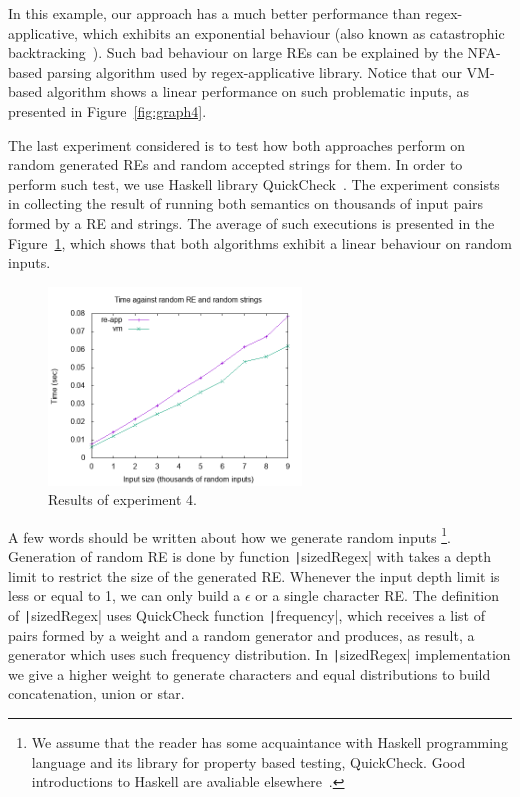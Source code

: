 \documentclass[review]{elsarticle}
\newcommand{\haskell}[1]{\texttt|#1|}
\theoremstyle{definition}
\begin{document}
In this example, our approach has a much better performance than
regex-applicative, which exhibits an exponential behaviour (also known as
catastrophic backtracking~\cite{Kirrage13}). Such bad 
behaviour on large REs can be explained by the NFA-based parsing algorithm  
used by regex-applicative library. Notice that our VM-based algorithm shows 
a linear performance on such problematic inputs, as presented in
Figure~\ref{fig:graph4}.

The last experiment considered is to test how both approaches perform
on random generated REs and random accepted strings for them. In order to
perform such test, we use Haskell library QuickCheck~\cite{Claessen2000}.
The experiment consists in collecting the result of running both semantics 
on thousands of input pairs formed by a RE and strings. The average of such 
executions is presented in the Figure~\ref{fig:graph5}, which shows that both 
algorithms exhibit a linear behaviour  on random inputs.

\begin{figure}[h]
    \includegraphics[width=0.6\textwidth]{random.png}
   \centering
   \caption{Results of experiment 4.}
   \label{fig:graph5}
\end{figure}

A few words should be written about how we generate random inputs
\footnote{We
  assume that the reader has some acquaintance with Haskell programming language
and its library for property based testing, QuickCheck. Good introductions to
Haskell are avaliable elsewhere~\cite{Lipovaca2011}.}. 
Generation of random RE is done by function \haskell{sizedRegex} with takes a depth limit to restrict
the size of the generated RE. Whenever the input depth limit is less or equal to 1, we can
only build a $\epsilon$ or a single character RE. The definition of \haskell{sizedRegex} uses
QuickCheck function \haskell{frequency}, which receives a list of pairs formed by a weight and
a random generator and produces, as result, a generator which uses such frequency distribution.
In \haskell{sizedRegex} implementation we give a higher weight to generate characters and equal distributions
to build concatenation, union or star.
\end{document}
